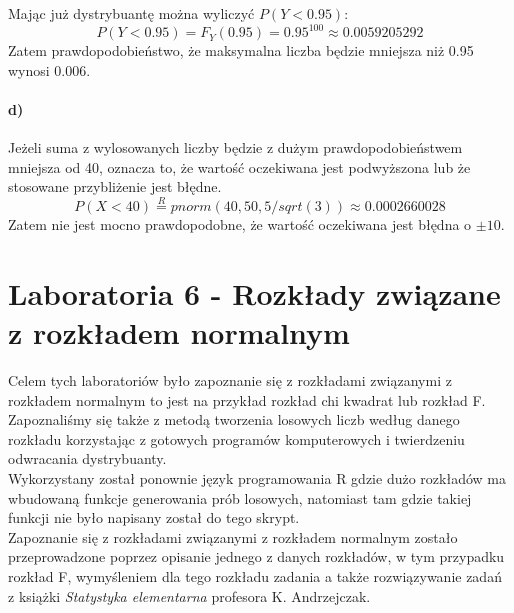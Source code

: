 \documentclass{article}
\begin{document}
{Mając już dystrybuantę można wyliczyć $P(Y<0.95)$:
\[
P(Y<0.95) = F_Y(0.95) = 0.95^{100} \approx 0.0059205292
\]
Zatem prawdopodobieństwo, że maksymalna liczba będzie mniejsza niż 0.95 wynosi 0.006.

\subsection{d)}
Jeżeli suma z wylosowanych liczby będzie z dużym prawdopodobieństwem mniejsza od 40, oznacza to, że wartość oczekiwana jest podwyższona lub że stosowane przybliżenie jest błędne. 
\[
P(X<40) \overset{R}{=} pnorm(40, 50, 5/sqrt(3)) \approx 0.0002660028
\]
Zatem nie jest mocno prawdopodobne, że wartość oczekiwana jest błędna o $\pm10$.

\newpage
\part{Laboratoria 6 - Rozkłady związane z rozkładem normalnym}
Celem tych laboratoriów było zapoznanie się z rozkładami związanymi z rozkładem normalnym to jest na przykład rozkład chi kwadrat lub rozkład F. Zapoznaliśmy się także z metodą tworzenia losowych liczb według danego rozkładu korzystając z gotowych programów komputerowych i twierdzeniu odwracania dystrybuanty. \\
Wykorzystany został ponownie język programowania R gdzie dużo rozkładów ma wbudowaną funkcje generowania prób losowych, natomiast tam gdzie takiej funkcji nie było napisany został do tego skrypt. \\
Zapoznanie się z rozkładami związanymi z rozkładem normalnym zostało przeprowadzone poprzez opisanie jednego z danych rozkładów, w tym przypadku rozkład F, wymyśleniem dla tego rozkładu zadania a także rozwiązywanie zadań z książki \textit{Statystyka elementarna} profesora K. Andrzejczak.

}
\end{document}

